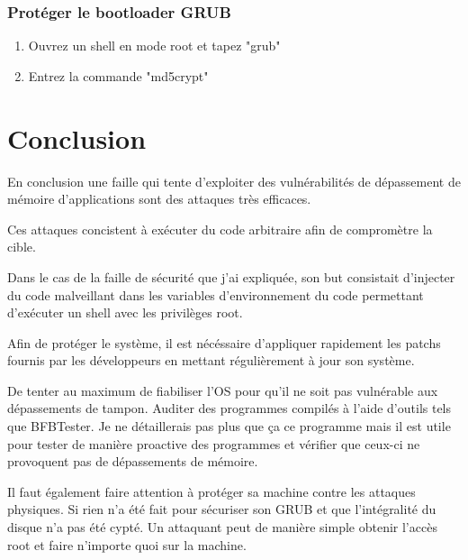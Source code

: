 \documentclass[12pt,a4paper]{article}
\begin{document}
        \subsubsection{Protéger le bootloader GRUB}
        \begin{enumerate}
            \item Ouvrez un shell en mode root et tapez "grub"
            \item Entrez la commande "md5crypt" 
        \end{enumerate}
        \newpage
        \section{Conclusion}
        \begin{flushleft}
            \item En conclusion une faille qui tente d'exploiter des vulnérabilités de dépassement de mémoire d'applications sont des attaques très efficaces.
            \item Ces attaques concistent à exécuter du code arbitraire afin de compromètre la cible. 
            \item Dans le cas de la faille de sécurité que j'ai expliquée, son but consistait d'injecter du code malveillant dans les variables d'environnement du code permettant d'exécuter un shell avec les privilèges root.
            \item Afin de protéger le système, il est nécéssaire d'appliquer rapidement les patchs fournis par les développeurs en mettant régulièrement à jour son système. 
            \item De tenter au maximum de fiabiliser l'OS pour qu'il ne soit pas vulnérable aux dépassements de tampon. Auditer des programmes compilés à l'aide d'outils tels que BFBTester. Je ne détaillerais pas plus que ça ce programme mais il est utile pour tester de manière proactive des programmes et vérifier que ceux-ci ne provoquent pas de dépassements de mémoire.
            \item Il faut également faire attention à protéger sa machine contre les attaques physiques. Si rien n'a été fait pour sécuriser son GRUB et que l'intégralité du disque n'a pas été cypté. Un attaquant peut de manière simple obtenir l'accès root et faire n'importe quoi sur la machine.
        \end{flushleft}
        \newpage
        \nocite{*}
	
	
\end{document}
